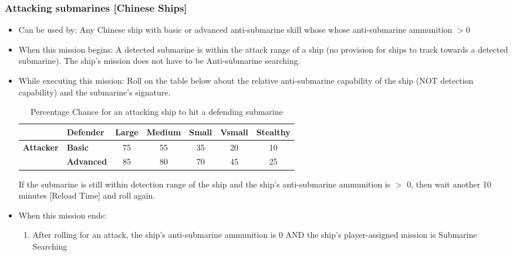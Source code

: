 \documentclass{article}
\begin{document}
    \subsubsection{Attacking submarines [Chinese Ships]}
        \begin{itemize}
            \item{Can be used by:} Any Chinese ship with basic or advanced anti-submarine skill whose whose anti-submarine ammunition $>0$
            \item{When this mission begins:} A detected submarine is within the attack range of a ship (no provision for ships to track towards a detected submarine). The ship's mission does not have to be Anti-submarine searching.
            \item{While executing this mission:} Roll on the table below about the relative anti-submarine capability of the ship (NOT detection capability) and the submarine's signature.
                \begin{table}[h!]
                    \centering
                    \begin{tabular}{|l|l|c|c|c|c|c|}
                    \hline
                    \textbf{} & \textbf{Defender} & \textbf{Large} & \textbf{Medium} & \textbf{Small} & \textbf{Vsmall} & \textbf{Stealthy} \\ \hline
                    \multirow{2}{*}{\textbf{Attacker}} & \textbf{{Basic}}  & 75 & 55 & 35 & 20 & 10 \\ \cline{2-7} 
                     & \textbf{Advanced} & 85 & 80 & 70 & 45 & 25 \\ \hline
                    \end{tabular}
                    \caption{Percentage Chance for an attacking ship to hit a defending submarine}
                    \label{tab:ChineseShipsvsCoalitionSubmarines}
                \end{table}
                If the submarine is still within detection range of the ship and the ship's anti-submarine ammunition is $>$ 0, then wait another 10 minutes [Reload Time] and roll again.
            \item{When this mission ends:}
            \begin{enumerate}[label=\arabic*)]
                \item After rolling for an attack, the ship's anti-submarine ammunition is 0 AND the ship's player-assigned mission is Submarine Searching \par
                [Ship's mission becomes Transit to Base]

\end{enumerate}
\end{itemize}
\end{document}
